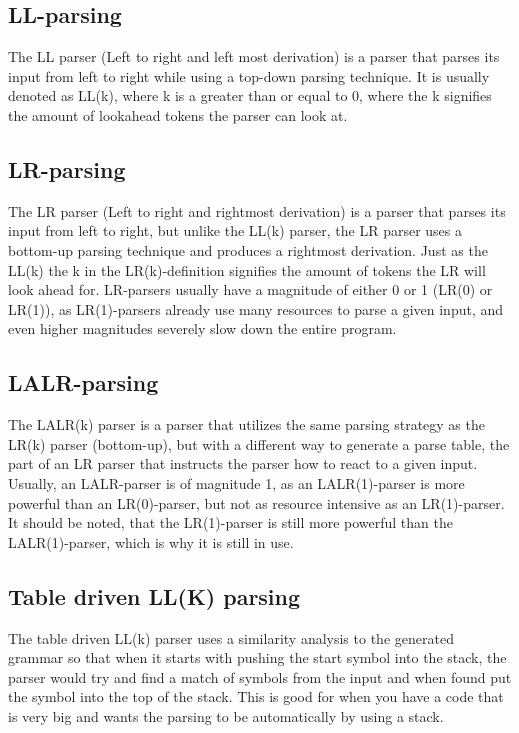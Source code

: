 \subsection*{LL-parsing}
The LL parser (Left to right and left most derivation) is a parser that parses its input from left to right while using a top-down parsing technique. It is usually denoted as LL(k), where k is a greater than or equal to 0, where the k signifies the amount of lookahead tokens the parser can look at\cite{conceptsOfProgrammingLanguages}.


\subsection*{LR-parsing}
The LR parser (Left to right and rightmost derivation) is a parser that parses its input from left to right, but unlike the LL(k) parser, the LR parser uses a bottom-up parsing technique and produces a rightmost derivation. Just as the LL(k) the k in the LR(k)-definition signifies the amount of tokens the LR will look ahead for\cite{LL-LR-Difference}. LR-parsers usually have a magnitude of either 0 or 1 (LR(0) or LR(1)), as LR(1)-parsers already use many resources to parse a given input, and even higher magnitudes severely slow down the entire program.


\subsection*{LALR-parsing}
The LALR(k) parser is a parser that utilizes the same parsing strategy as the LR(k) parser (bottom-up), but with a different way to generate a parse table, the part of an LR parser that instructs the parser how to react to a given input. Usually, an LALR-parser is of magnitude 1, as an LALR(1)-parser is more powerful than an LR(0)-parser, but not as resource intensive as an LR(1)-parser. It should be noted, that the LR(1)-parser is still more powerful than the LALR(1)-parser, which is why it is still in use\cite{crafting-a-compiler}.


\subsection*{Table driven LL(K) parsing}
The table driven LL(k) parser uses a similarity analysis to the generated grammar so that when it starts with pushing the start symbol into the stack, the parser would try and find a match of symbols from the input and when found put the symbol into the top of the stack\cite{crafting-a-compiler}. This is good for when you have a code that is very big and wants the parsing to be automatically by using a stack.
\\

